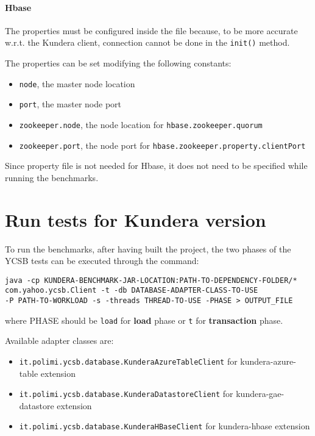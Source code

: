 \paragraph{Hbase}
The properties must be configured inside the file because, to be more accurate w.r.t. the Kundera client, connection cannot be done in the \texttt{init()} method. 

\noindent The properties can be set modifying the following constants:
\begin{itemize}
\item \texttt{node}, the master node location
\item \texttt{port}, the master node port
\item \texttt{zookeeper.node}, the node location for \texttt{hbase.zookeeper.quorum}
\item \texttt{zookeeper.port}, the node port for \texttt{hbase.zookeeper.property.clientPort}
\end{itemize}

\noindent Since property file is not needed for Hbase, it does not need to be specified while running the benchmarks.

\section{Run tests for Kundera version}
\label{appendix:ycsb-kundera}
To run the benchmarks, after having built the project, the two phases of the YCSB tests can be executed through the command:

\begin{verbatim}
java -cp KUNDERA-BENCHMARK-JAR-LOCATION:PATH-TO-DEPENDENCY-FOLDER/*
com.yahoo.ycsb.Client -t -db DATABASE-ADAPTER-CLASS-TO-USE
-P PATH-TO-WORKLOAD -s -threads THREAD-TO-USE -PHASE > OUTPUT_FILE
\end{verbatim}

\noindent where PHASE should be \texttt{load} for \textbf{load} phase or \texttt{t} for \textbf{transaction} phase.

\newparagraph Available adapter classes are:
\begin{itemize}
\item \texttt{it.polimi.ycsb.database.KunderaAzureTableClient} for kundera-azure-table extension
\item \texttt{it.polimi.ycsb.database.KunderaDatastoreClient} for kundera-gae-datastore extension
 \item\texttt{it.polimi.ycsb.database.KunderaHBaseClient} for kundera-hbase extension
\end{itemize}

